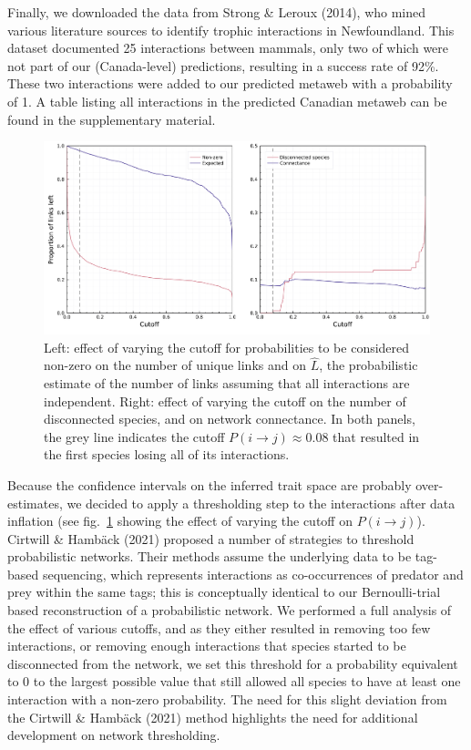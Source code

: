 \documentclass[11pt]{article}
\makeatletter
\def\maxwidth{\ifdim\Gin@nat@width>\linewidth\linewidth
\else\Gin@nat@width\fi}
\let\Oldincludegraphics\includegraphics
\renewcommand{\includegraphics}[1]{\Oldincludegraphics[width=\maxwidth]{#1}}
\makeatother
\begin{document}
Finally, we downloaded the data from Strong \& Leroux (2014), who mined
various literature sources to identify trophic interactions in
Newfoundland. This dataset documented 25 interactions between mammals,
only two of which were not part of our (Canada-level) predictions,
resulting in a success rate of 92\%. These two interactions were added
to our predicted metaweb with a probability of 1. A table listing all
interactions in the predicted Canadian metaweb can be found in the
supplementary material.

\begin{figure}
\hypertarget{fig:thresholds}{%
\centering
\includegraphics{figures/figure-cutoffs.png}
\caption{Left: effect of varying the cutoff for probabilities to be
considered non-zero on the number of unique links and on \(\hat{L}\),
the probabilistic estimate of the number of links assuming that all
interactions are independent. Right: effect of varying the cutoff on the
number of disconnected species, and on network connectance. In both
panels, the grey line indicates the cutoff
\(P(i\rightarrow j) \approx 0.08\) that resulted in the first species
losing all of its interactions.}\label{fig:thresholds}
}
\end{figure}

Because the confidence intervals on the inferred trait space are
probably over-estimates, we decided to apply a thresholding step to the
interactions after data inflation (see fig.~\ref{fig:thresholds} showing
the effect of varying the cutoff on \(P(i \rightarrow j)\)). Cirtwill \&
Hambäck (2021) proposed a number of strategies to threshold
probabilistic networks. Their methods assume the underlying data to be
tag-based sequencing, which represents interactions as co-occurrences of
predator and prey within the same tags; this is conceptually identical
to our Bernoulli-trial based reconstruction of a probabilistic network.
We performed a full analysis of the effect of various cutoffs, and as
they either resulted in removing too few interactions, or removing
enough interactions that species started to be disconnected from the
network, we set this threshold for a probability equivalent to 0 to the
largest possible value that still allowed all species to have at least
one interaction with a non-zero probability. The need for this slight
deviation from the Cirtwill \& Hambäck (2021) method highlights the need
for additional development on network thresholding.
\end{document}
